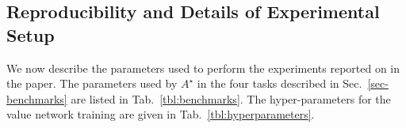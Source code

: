 \documentclass[fullpage,twocolumn]{article} %
\begin{document}
  




%

\subsection{Reproducibility and Details of Experimental Setup}
\label{sec:exp-setup}
We now describe the parameters used to perform the experiments reported on in the paper. The parameters used by $A^\star$ in the four tasks described in Sec.~\ref{sec-benchmarks} are listed in Tab.~\ref{tbl:benchmarks}. The hyper-parameters for the value network training are given in Tab.~\ref{tbl:hyperparameters}.
\end{document}
